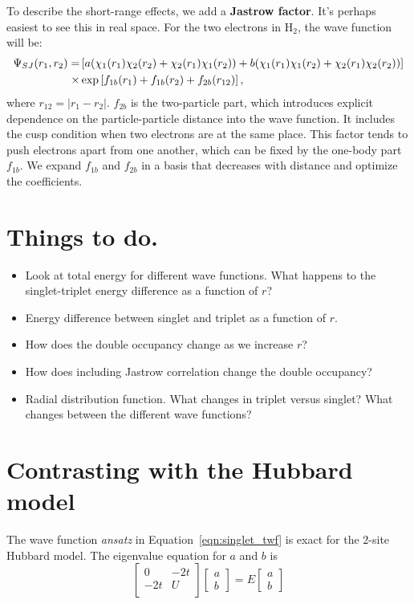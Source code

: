 \documentclass[12pt]{article}
\begin{document}
To describe the short-range effects, we add a {\bf Jastrow factor}.
It's perhaps easiest to see this in real space.
For the two electrons in H$_2$, the wave function will be:
\begin{align}
\Psi_{SJ}(r_1,r_2)=&\left[a(\chi_1(r_1)\chi_2(r_2)+\chi_2(r_1)\chi_1(r_2)) + b(\chi_1(r_1)\chi_1(r_2)+\chi_2(r_1)\chi_2(r_2)) \right] \notag \\
\times& \exp\left[f_{1b}(r_1)+f_{1b}(r_2) + f_{2b}(r_{12})\right],
\label{eqn:slater-jastrow}	
\end{align}
where $r_{12}=|r_1-r_2|$. $f_{2b}$ is the two-particle part, which introduces explicit dependence on the particle-particle distance into the wave function.
It includes the cusp condition when two electrons are at the same place. 
This factor tends to push electrons apart from one another, which can be fixed by the one-body part $f_{1b}$. 
We expand $f_{1b}$ and $f_{2b}$ in a basis that decreases with distance and optimize the coefficients. 


\section*{Things to do.}

\begin{itemize}
\item Look at total energy for different wave functions. What happens to the singlet-triplet energy difference as a function of $r$?
\item Energy difference between singlet and triplet as a function of $r$.
\item How does the double occupancy change as we increase $r$?
\item How does including Jastrow correlation change the double occupancy? 
\item Radial distribution function. What changes in triplet versus singlet? What changes between the different wave functions?
\end{itemize}

\section*{Contrasting with the Hubbard model}

The wave function {\it ansatz} in Equation~\ref{eqn:singlet_twf} is exact for the 2-site Hubbard model. 
The eigenvalue equation for $a$ and $b$ is 
\begin{equation}
	\begin{bmatrix}
	  0 & -2t \\
	  -2t & U \\
    \end{bmatrix} 
\begin{bmatrix}
         a \\
         b
        \end{bmatrix} 
    =
E\begin{bmatrix}
         a \\
         b
        \end{bmatrix} 
\end{equation}
\end{document}

